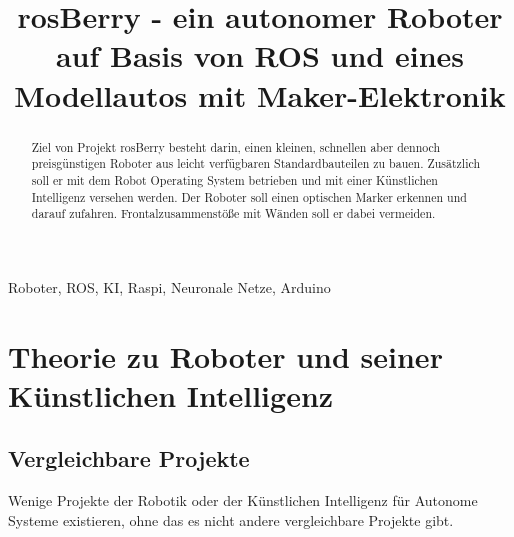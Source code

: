\documentclass[conference]{IEEEtran}
\begin{document}
\title{rosBerry - ein autonomer Roboter auf Basis von ROS und eines Modellautos mit Maker-Elektronik}

\author{
%
\and
{}
\and
{}
}

\maketitle

\begin{abstract}
Ziel von Projekt rosBerry besteht darin, einen kleinen, schnellen aber dennoch preisgünstigen Roboter aus leicht verfügbaren Standardbauteilen zu bauen.
Zusätzlich soll er mit dem Robot Operating System betrieben und mit einer Künstlichen Intelligenz versehen werden.
Der Roboter soll einen optischen Marker erkennen und darauf zufahren.
Frontalzusammenstöße mit Wänden soll er dabei vermeiden.
\end{abstract}

\begin{IEEEkeywords}
Roboter, ROS, KI, Raspi, Neuronale Netze, Arduino
\end{IEEEkeywords}

\section{Theorie zu Roboter und seiner Künstlichen Intelligenz}

\subsection{Vergleichbare Projekte}	%
Wenige Projekte der Robotik oder der Künstlichen Intelligenz für Autonome Systeme existieren, ohne das es nicht andere vergleichbare Projekte gibt.
\\
\end{document}
